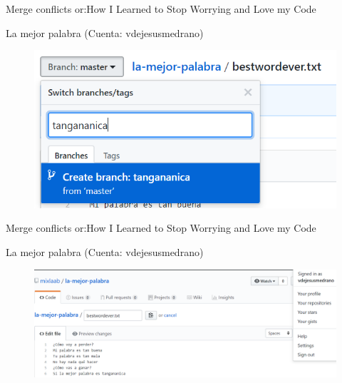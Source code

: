\documentclass[10pt]{beamer}
\begin{document}
\begin{frame}{Merge conflicts or:}{How I Learned to Stop Worrying and Love my Code \heartsuit}

\begin{block}{La mejor palabra (Cuenta: vdejesusmedrano)}

\begin{figure}[h!]
\centering
\includegraphics [scale=0.3]{tangananicabranch}
\label{fig:issues}
\end{figure}
    
\end{block}

\end{frame}

\begin{frame}{Merge conflicts or:}{How I Learned to Stop Worrying and Love my Code \heartsuit}

\begin{block}{La mejor palabra (Cuenta: vdejesusmedrano)}

\begin{figure}[h!]
\centering
\includegraphics [scale=0.25]{tangananica}
\label{fig:issues}
\end{figure}
    
\end{block}

\end{frame}
\end{document}

